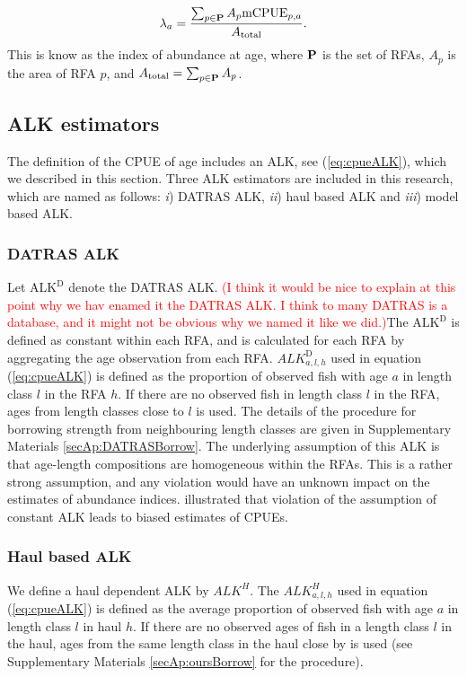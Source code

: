 \documentclass[a4paper 12pt]{article}
\numberwithin{equation}{section}
\newcommand{\ed}[1]{\textcolor{red}{#1}}
\begin{document}
\begin{equation}
\lambda_{a}= \frac{\sum_{p\in {\bf P}} A_{p}  \mathrm{mCPUE}_{p,a}}{A_{\text{total}}}.
\label{abundanceestimatornorthsea}
\end{equation}
This is know as the index of abundance at age, where ${\bf P}$ is the set of RFAs, $A_p$ is the area of RFA $p$, and $A_{\text{total}} = \sum_{p\in {\bf P}} A_{p}$.
\subsection{ALK estimators}
\label{sec:alkmethods}
The definition of the CPUE of age includes an ALK, see (\ref{eq:cpueALK}), which we described in this section. Three ALK estimators are included in this research, which are named as follows:  \textit{i}) DATRAS ALK, \textit{ii}) haul based ALK and \textit{iii}) model based ALK.
\subsubsection{DATRAS ALK}
\label{sec:datrasalkestimator}
Let $\text{ALK}^{\text{D}}$ denote the DATRAS ALK. \ed{(I think it would be nice to explain at this point why we hav enamed it the DATRAS ALK. I think to many DATRAS is a database, and it might not be obvious why we named it like we did.)}The $\text{ALK}^{\text{D}}$ is defined as constant within each RFA, and is calculated for each RFA by aggregating the age observation from each RFA. $ALK^{\text{D}}_{a,l,h}$ used in equation (\ref{eq:cpueALK}) is defined as the proportion of observed fish with age $a$ in length class $l$ in the RFA $h$. If there are no observed fish in length class $l$ in the RFA, ages from length classes close to $l$ is used. The details of the procedure for borrowing strength from neighbouring length classes are given in Supplementary Materials \ref{secAp:DATRASBorrow}. The underlying assumption of this ALK  is that age-length compositions are homogeneous within the RFAs. This is a rather strong assumption, and any violation would have an unknown impact on the estimates of abundance indices. \citet{aanes2015efficient} illustrated that violation of the assumption of constant ALK leads to biased estimates of CPUEs. 

\subsubsection{Haul based ALK}
\label{sec:haulestimator}
We define a haul dependent ALK  by  $ALK^{H}$. The $ALK^{H}_{a,l,h}$  used in equation (\ref{eq:cpueALK}) is defined as the average proportion of observed fish with age $a$ in  length class $l$ in haul $h$. If there are no observed ages of fish in a length class $l$ in the haul, ages from the same length class in the haul close by is used (see Supplementary Materials \ref{secAp:oursBorrow} for the procedure).
\end{document}
